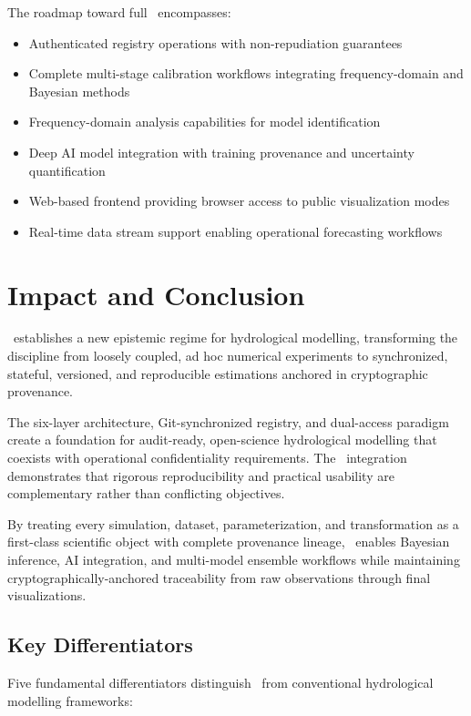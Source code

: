 The roadmap toward full \hydrot\ encompasses:
\begin{itemize}
\item Authenticated registry operations with non-repudiation guarantees
\item Complete multi-stage calibration workflows integrating frequency-domain and Bayesian methods
\item Frequency-domain analysis capabilities for model identification
\item Deep AI model integration with training provenance and uncertainty quantification
\item Web-based frontend providing browser access to public visualization modes
\item Real-time data stream support enabling operational forecasting workflows
\end{itemize}

\section{Impact and Conclusion}

\hydrot\ establishes a new epistemic regime for hydrological modelling, transforming the discipline from loosely coupled, ad hoc numerical experiments to synchronized, stateful, versioned, and reproducible estimations anchored in cryptographic provenance.

The six-layer architecture, Git-synchronized registry, and dual-access paradigm create a foundation for audit-ready, open-science hydrological modelling that coexists with operational confidentiality requirements. The \cwv\ integration demonstrates that rigorous reproducibility and practical usability are complementary rather than conflicting objectives.

By treating every simulation, dataset, parameterization, and transformation as a first-class scientific object with complete provenance lineage, \hydrot\ enables Bayesian inference, AI integration, and multi-model ensemble workflows while maintaining cryptographically-anchored traceability from raw observations through final visualizations.

\subsection{Key Differentiators}

Five fundamental differentiators distinguish \hydrot\ from conventional hydrological modelling frameworks:

